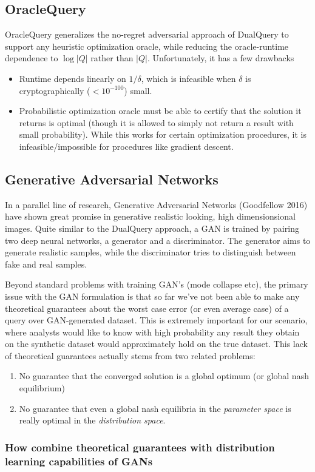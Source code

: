 \documentclass[
]{article}
\begin{document}
\hypertarget{header-n26}{%
\subsection{OracleQuery}\label{header-n26}}

OracleQuery generalizes the no-regret adversarial approach of DualQuery
to support any heuristic optimization oracle, while reducing the
oracle-runtime dependence to \(\log |Q|\) rather than \(|Q|\).
Unfortunately, it has a few drawbacks

\begin{itemize}
\item
  Runtime depends linearly on \(1/\delta\), which is infeasible when
  \(\delta\) is cryptographically (\(<10^{-100}\)) small.
\item
  Probabilistic optimization oracle must be able to certify that the
  solution it returns is optimal (though it is allowed to simply not
  return a result with small probability). While this works for certain
  optimization procedures, it is infeasible/impossible for procedures
  like gradient descent. 
\end{itemize}

\hypertarget{header-n20}{%
\subsection{Generative Adversarial Networks}\label{header-n20}}

In a parallel line of research, Generative Adversarial Networks
(Goodfellow 2016) have shown great promise in generative realistic
looking, high dimensionsional images. Quite similar to the DualQuery
approach, a GAN is trained by pairing two deep neural networks, a
generator and a discriminator. The generator aims to generate realistic
samples, while the discriminator tries to distinguish between fake and
real samples.

Beyond standard problems with training GAN's (mode collapse etc), the
primary issue with the GAN formulation is that so far we've not been
able to make any theoretical guarantees about the worst case error (or
even average case) of a query over GAN-generated dataset. This is
extremely important for our scenario, where analysts would like to know
with high probability any result they obtain on the synthetic dataset
would approximately hold on the true dataset. This lack of theoretical
guarantees actually stems from two related problems:

\begin{enumerate}
\def\labelenumi{\arabic{enumi}.}
\item
  No guarantee that the converged solution is a global optimum (or
  global nash equilibrium)
\item
  No guarantee that even a global nash equilibria in the \emph{parameter
  space} is really optimal in the \emph{distribution space}. 
\end{enumerate}

\hypertarget{header-n24}{%
\subsubsection{How combine theoretical guarantees with distribution
learning capabilities of GANs}\label{header-n24}}
\end{document}
